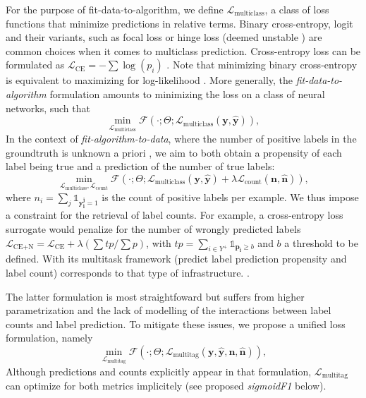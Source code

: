 For the purpose of fit-data-to-algorithm, we define \(\mathcal{L}_{\text {multiclass}}\), a class of loss functions that minimize predictions in relative terms. Binary cross-entropy, logit and their variants, such as focal loss or hinge loss (deemed unstable \cite{focalLoss} ) are common choices when it comes to multiclass prediction. Cross-entropy loss can be formulated as \(\mathcal{L}_{\text {CE}}=-\sum \log \left(p_{i}\right)\) . Note that minimizing binary cross-entropy is equivalent to maximizing for log-likelihood \cite[Section 4.3.4]{Bishop}. More generally, the \emph{fit-data-to-algorithm} formulation amounts to minimizing the loss on a class of neural networks, such that
%
\begin{equation}
\underset{\mathcal{L}_{\text {multiclass}}} {\min} \mathcal{F}\left(\cdot ; \Theta; \mathcal{L}_{\text {multiclass}} (\mathbf{y}, \hat{\mathbf{y}}) \right),
\end{equation}
%
In the context of \emph{fit-algorithm-to-data}, where the number of positive labels in the groundtruth is unknown a priori , we aim to both obtain a propensity of each label being true and a prediction of the number of true labels: 
%
\begin{equation}
\underset{\mathcal{L}_{\text {multiclass}}, \mathcal{L}_{\text {count}}} {\min} \mathcal{F}\left(\cdot ; \Theta; \mathcal{L}_{\text {multiclass}} (\mathbf{y}, \hat{\mathbf{y}}) + \lambda \mathcal{L}_{\text {count}} (\mathbf{n}, \hat{\mathbf{n}})\right),
\end{equation}
%
where \(n_i = \sum_j \mathds{1}_{\mathbf{y_i^j} = 1}\) is the count of positive labels per example. We thus impose a constraint for the retrieval of label counts. For example, a cross-entropy loss surrogate  would penalize for the number of wrongly predicted labels \(\mathcal{L}_{\text {CE+N}}= \mathcal{L}_{\text {CE}} + \lambda (\sum tp / \sum p)\), with \(t p=\sum_{i \in Y^{+}} \mathds{1}_{\mathbf{p_i} \geq b}\) and \(b\) a threshold to be defined. With its multitask framework (predict label prediction propensity and label count) \cite{multitaskLabel} corresponds to that type of infrastructure. .

The latter formulation is most straightfoward but suffers from higher parametrization and the lack of modelling of the interactions between label counts and label prediction. To mitigate these issues, we propose a unified loss formulation, namely
%
\begin{equation}
\underset{\mathcal{L}_{\text {multitag}}} {\min} \mathcal{F}\left(\cdot ; \Theta; \mathcal{L}_{\text {multitag}} (\mathbf{y}, \hat{\mathbf{y}}, \mathbf{n}, \hat{\mathbf{n}}) \right),
\end{equation}
%
Although predictions and counts explicitly appear in that formulation, \(\mathcal{L}_{\text {multitag}}\) can optimize for both metrics implicitely (see proposed \emph{sigmoidF1} below).



